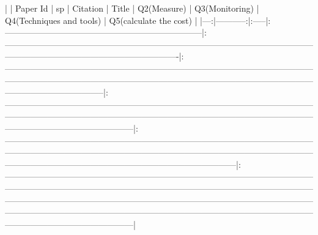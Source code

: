 |    |   Paper Id | sp   | Citation                                                             | Title                                                                                                                                                                    | Q2(Measure)                                                                                                                                                                                                                                                | Q3(Monitoring)                                                                                                                                                                                                                                                       | Q4(Techniques and tools)                                                                                                                                                                                                                                                                                 | Q5(calculate the cost)                                                                                                                                                                                                                                                                                                                                                                                                                                                                       |
|---:|-----------:|:-----|:---------------------------------------------------------------------|:-------------------------------------------------------------------------------------------------------------------------------------------------------------------------|:-----------------------------------------------------------------------------------------------------------------------------------------------------------------------------------------------------------------------------------------------------------|:---------------------------------------------------------------------------------------------------------------------------------------------------------------------------------------------------------------------------------------------------------------------|:---------------------------------------------------------------------------------------------------------------------------------------------------------------------------------------------------------------------------------------------------------------------------------------------------------|:---------------------------------------------------------------------------------------------------------------------------------------------------------------------------------------------------------------------------------------------------------------------------------------------------------------------------------------------------------------------------------------------------------------------------------------------------------------------------------------------|
